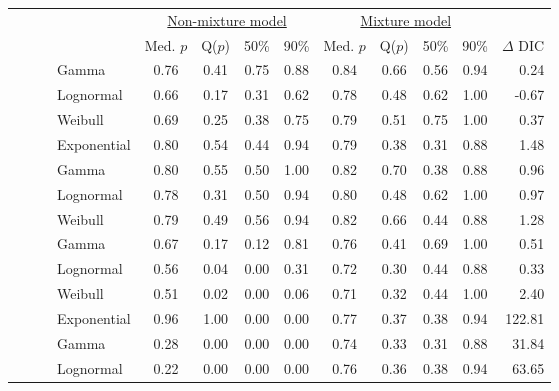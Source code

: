 \documentclass[useAMS,usenatbib,referee,12pt]{article}
\newif\ifdic   %
\begin{document}
\ifdic
\begin{table}[ht]\centering\small
\begin{tabular}{l|l|l|l|cccc|cccc||r}
 \multicolumn{4}{c|}{ } & \multicolumn{4}{c|}{\underline{Non-mixture model}} & \multicolumn{4}{c||}{\underline{Mixture model}} & \\
 \multicolumn{4}{c|}{ } & Med. $p$ & Q($p$) & 50\% & 90\% & Med. $p$ & Q($p$) & 50\% & 90\% & $\Delta$ DIC \\ 
  \hline
  \hline
 \parbox[t]{2mm}{} & \parbox[t]{2mm}{} & \parbox[t]{2mm}{} & Gamma & 0.76 & 0.41 & 0.75 & 0.88 & 0.84 & 0.66 & 0.56 & 0.94 & 0.24 \\ 
 & & &   Lognormal & 0.66 & 0.17 & 0.31 & 0.62 & 0.78 & 0.48 & 0.62 & 1.00 & -0.67 \\ 
 & & &   Weibull & 0.69 & 0.25 & 0.38 & 0.75 & 0.79 & 0.51 & 0.75 & 1.00 & 0.37 \\ 
 & & &   Exponential & 0.80 & 0.54 & 0.44 & 0.94 & 0.79 & 0.38 & 0.31 & 0.88 & 1.48 \\ 
 & & \parbox[t]{2mm}{} &  Gamma & 0.80 & 0.55 & 0.50 & 1.00 & 0.82 & 0.70 & 0.38 & 0.88 & 0.96 \\ 
 & & &   Lognormal & 0.78 & 0.31 & 0.50 & 0.94 & 0.80 & 0.48 & 0.62 & 1.00 & 0.97 \\ 
 & & &   Weibull & 0.79 & 0.49 & 0.56 & 0.94 & 0.82 & 0.66 & 0.44 & 0.88 & 1.28 \\ 
& \parbox[t]{2mm}{} & \parbox[t]{2mm}{} & Gamma & 0.67 & 0.17 & 0.12 & 0.81 & 0.76 & 0.41 & 0.69 & 1.00 & 0.51 \\ 
 & & &   Lognormal & 0.56 & 0.04 & 0.00 & 0.31 & 0.72 & 0.30 & 0.44 & 0.88 & 0.33 \\ 
 & & &   Weibull & 0.51 & 0.02 & 0.00 & 0.06 & 0.71 & 0.32 & 0.44 & 1.00 & 2.40 \\ 
 & & &   Exponential & 0.96 & 1.00 & 0.00 & 0.00 & 0.77 & 0.37 & 0.38 & 0.94 & 122.81 \\ 
 & & \parbox[t]{2mm}{} & Gamma & 0.28 & 0.00 & 0.00 & 0.00 & 0.74 & 0.33 & 0.31 & 0.88 & 31.84 \\ 
 & & &   Lognormal & 0.22 & 0.00 & 0.00 & 0.00 & 0.76 & 0.36 & 0.38 & 0.94 & 63.65 \\ 

\end{tabular}
\end{table}
\end{document}
